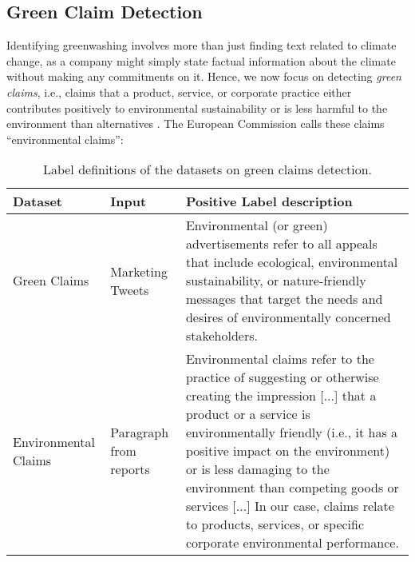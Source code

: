 \subsection{Green Claim Detection}
\label{sec:green claim}


Identifying greenwashing involves more than just finding text related to climate change, as a company might simply state factual information about the climate without making any commitments on it. Hence, we now focus on detecting \textit{green claims}, i.e., claims that a product, service, or corporate practice either contributes positively to environmental sustainability or is less harmful to the environment than alternatives \cite{stammbach_environmental_2023,vinicius_woloszyn_towards_2021}. The European Commission calls these claims ``environmental claims'':

\begin{table}[ht]
\centering
\begin{tabular}{p{2.5cm}p{3cm}p{8.5cm}}
\toprule
\textbf{Dataset}  & \textbf{Input}  & \textbf{Positive Label description}\\ \midrule
Green Claims \cite{vinicius_woloszyn_towards_2021}  & Marketing Tweets  & Environmental (or green) advertisements refer to all appeals that include ecological, environmental sustainability, or nature-friendly messages that target the needs and desires of environmentally concerned stakeholders. \\ \midrule
Environmental Claims \cite{stammbach_environmental_2023} & Paragraph from reports  & Environmental claims refer to the practice of suggesting or otherwise creating the impression [...] that a product or a service is environmentally friendly (i.e., it has a positive impact on the environment) or is less damaging to the environment than competing goods or services [...]
In our case, claims relate to products, services, or specific corporate environmental performance.   \\ \bottomrule
\end{tabular}
\caption{Label definitions of the datasets on green claims detection.}
\label{tab:guidelines characteristics}
\end{table}



